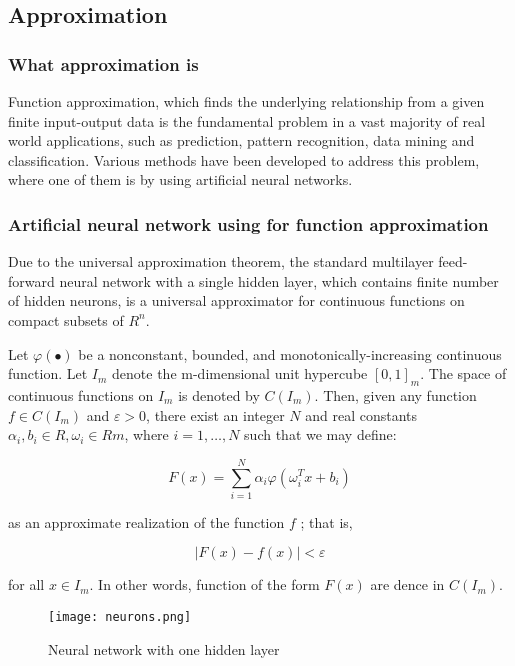 \documentclass[a4paper,12pt]{article}
\begin{document}
\subsection{Approximation}
\subsubsection{What approximation is}

Function approximation, which finds the underlying relationship from a given finite input-output data is the fundamental problem in a vast majority of real world applications, such as prediction, pattern recognition, data mining and classification. Various methods have been developed to address this problem, where one of them is by using artificial neural networks.

\subsubsection{Artificial neural network using for function approximation}

Due to the universal approximation theorem, the standard multilayer feed-forward neural network with a single hidden layer, which contains finite number of hidden neurons, is a universal approximator for continuous functions on compact subsets of $R^n$.

Let $\varphi(\bullet) $ be a nonconstant, bounded, and monotonically-increasing continuous function. Let $I_m$ denote the m-dimensional unit hypercube $ [0,1]_m. $ The space of continuous functions on $ I_m $ is denoted by $C(I_m)$. Then, given any function $ f \in C(I_m) $ and $ \varepsilon > 0 $, there exist an integer $ N $ and real constants $ \alpha_i, b_i \in R, \omega_i \in Rm $, where $ i = 1, \hdots, N $ such that we may define:

\begin{equation}
 F(x) = \sum\limits_{i=1}^N\alpha_i\varphi(\omega_i^Tx+b_i) 
\end{equation}

as an approximate realization of the function $ f $ ; that is,

\begin{equation}
 |F(x)-f(x)|<\varepsilon
\end{equation}

for all $ x \in I_m$. In other words, function of the form $ F(x) $ are dence in $ C(I_m) $.   
\begin{figure}[ht]
 \centering
 \texttt{[image: neurons.png]}
 \caption{Neural network with one hidden layer}
\end{figure}
\end{document}
